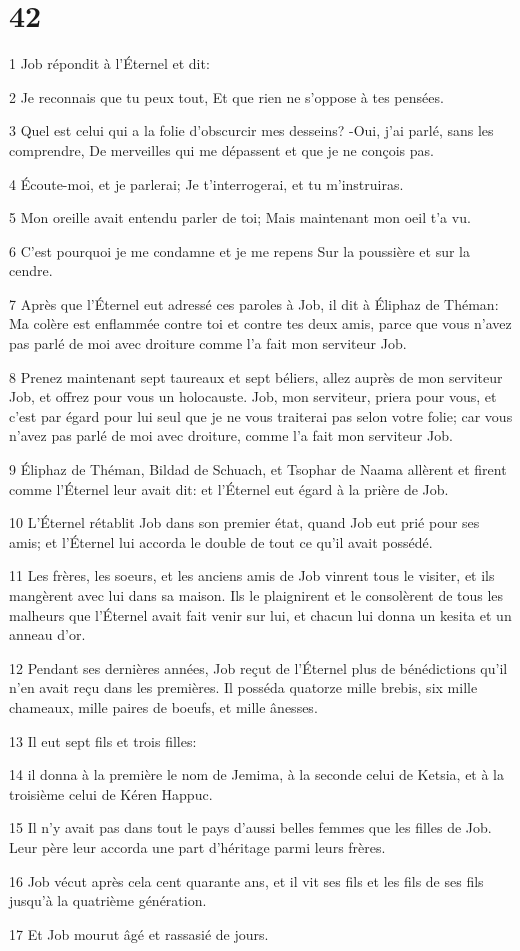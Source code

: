 \chapter{42}

\par 1 Job répondit à l'Éternel et dit:
\par 2 Je reconnais que tu peux tout, Et que rien ne s'oppose à tes pensées.
\par 3 Quel est celui qui a la folie d'obscurcir mes desseins? -Oui, j'ai parlé, sans les comprendre, De merveilles qui me dépassent et que je ne conçois pas.
\par 4 Écoute-moi, et je parlerai; Je t'interrogerai, et tu m'instruiras.
\par 5 Mon oreille avait entendu parler de toi; Mais maintenant mon oeil t'a vu.
\par 6 C'est pourquoi je me condamne et je me repens Sur la poussière et sur la cendre.
\par 7 Après que l'Éternel eut adressé ces paroles à Job, il dit à Éliphaz de Théman: Ma colère est enflammée contre toi et contre tes deux amis, parce que vous n'avez pas parlé de moi avec droiture comme l'a fait mon serviteur Job.
\par 8 Prenez maintenant sept taureaux et sept béliers, allez auprès de mon serviteur Job, et offrez pour vous un holocauste. Job, mon serviteur, priera pour vous, et c'est par égard pour lui seul que je ne vous traiterai pas selon votre folie; car vous n'avez pas parlé de moi avec droiture, comme l'a fait mon serviteur Job.
\par 9 Éliphaz de Théman, Bildad de Schuach, et Tsophar de Naama allèrent et firent comme l'Éternel leur avait dit: et l'Éternel eut égard à la prière de Job.
\par 10 L'Éternel rétablit Job dans son premier état, quand Job eut prié pour ses amis; et l'Éternel lui accorda le double de tout ce qu'il avait possédé.
\par 11 Les frères, les soeurs, et les anciens amis de Job vinrent tous le visiter, et ils mangèrent avec lui dans sa maison. Ils le plaignirent et le consolèrent de tous les malheurs que l'Éternel avait fait venir sur lui, et chacun lui donna un kesita et un anneau d'or.
\par 12 Pendant ses dernières années, Job reçut de l'Éternel plus de bénédictions qu'il n'en avait reçu dans les premières. Il posséda quatorze mille brebis, six mille chameaux, mille paires de boeufs, et mille ânesses.
\par 13 Il eut sept fils et trois filles:
\par 14 il donna à la première le nom de Jemima, à la seconde celui de Ketsia, et à la troisième celui de Kéren Happuc.
\par 15 Il n'y avait pas dans tout le pays d'aussi belles femmes que les filles de Job. Leur père leur accorda une part d'héritage parmi leurs frères.
\par 16 Job vécut après cela cent quarante ans, et il vit ses fils et les fils de ses fils jusqu'à la quatrième génération.
\par 17 Et Job mourut âgé et rassasié de jours.


